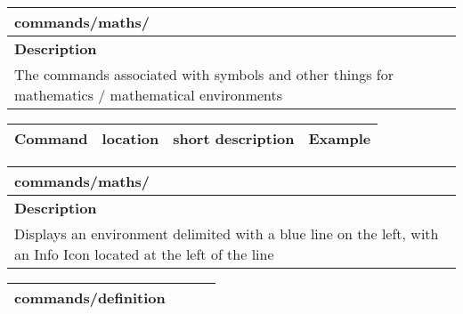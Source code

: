 \noindent\begin{tabularx}{\linewidth}{X}
	\toprule
	\textbf{commands/maths/\faAsterisk} \\
	\midrule
	\textbf{Description} \\
	The commands associated with symbols and other things for mathematics / mathematical environments \\
	\midrule
\end{tabularx}
\noindent\begin{tabularx}{\linewidth}{XXXX}
	\textbf{Command} & \textbf{location} & \textbf{short description} & \textbf{Example} \\
	\midrule

\end{tabularx}

\pagebreak

\noindent\begin{tabularx}{\linewidth}{X}
	\toprule
	\textbf{commands/maths/\faAsterisk} \\
	\midrule
	\textbf{Description} \\
	Displays an environment delimited with a blue line on the left, with an Info Icon located at the left of the line \\
	\midrule
\end{tabularx}
\noindent\begin{tabularx}{\linewidth}{XXXX}
    \midrule
    \textbf{commands/definition} \\
    \midrule
	\bottomrule
\end{tabularx}

